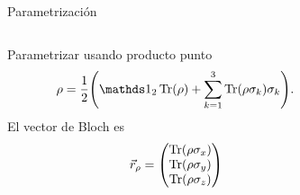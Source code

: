 \begin{frame}{Parametrización}
    \begin{columns}
        \begin{column}{0.5\textwidth}
            Parametrizar usando producto punto
            \begin{equation}
                \rho=\frac{1}{2}\qty(\Id_{2}\Tr(\rho)+\sum_{k=1}^{3}\Tr(\rho\pauli{k})\pauli{k}).\nonumber
            \end{equation}
            \pause
            El vector de Bloch es
            \begin{equation}
                \vec{r}_{\rho}=\begin{pmatrix}
                    \Tr(\rho\sigma_{x})\\
                    \Tr(\rho\sigma_{y})\\
                    \Tr(\rho\sigma_{z})
                \end{pmatrix}\nonumber
            \end{equation}
        \end{column}
        \pause
        \begin{column}{0.5\textwidth}
            \centering
            \BlochSphereDensity
        \end{column}
    \end{columns}
\end{frame}


